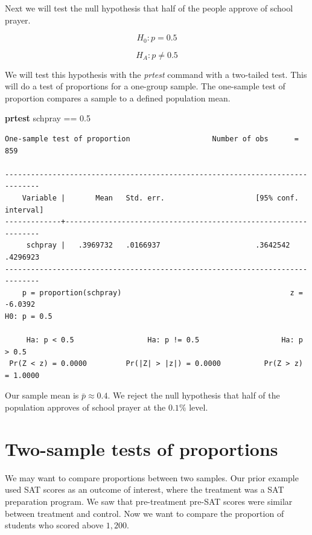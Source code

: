 \documentclass[
]{book}
\newenvironment{Shaded}{\begin{snugshade}}{\end{snugshade}}
\newcommand{\KeywordTok}[1]{\textcolor[rgb]{0.13,0.29,0.53}{\textbf{#1}}}
\newcommand{\NormalTok}[1]{#1}
\begin{document}
Next we will test the null hypothesis that half of the people approve of school prayer.

\[ H_{0}: p=0.5 \]

\[ H_{A}: p \neq 0.5 \]

We will test this hypothesis with the \emph{prtest} command with a two-tailed test. This will do a test of proportions for a one-group sample. The one-sample test of proportion compares a sample to a defined population mean.

\begin{Shaded}
\begin{Highlighting}[]
\KeywordTok{prtest}\NormalTok{ schpray == 0.5}
\end{Highlighting}
\end{Shaded}

\begin{verbatim}
One-sample test of proportion                   Number of obs      =       859

------------------------------------------------------------------------------
    Variable |       Mean   Std. err.                     [95% conf. interval]
-------------+----------------------------------------------------------------
     schpray |   .3969732   .0166937                      .3642542    .4296923
------------------------------------------------------------------------------
    p = proportion(schpray)                                       z =  -6.0392
H0: p = 0.5

     Ha: p < 0.5                 Ha: p != 0.5                   Ha: p > 0.5
 Pr(Z < z) = 0.0000         Pr(|Z| > |z|) = 0.0000          Pr(Z > z) = 1.0000
\end{verbatim}

Our sample mean is \(\bar{p} \approx 0.4\). We reject the null hypothesis that half of the population approves of school prayer at the \(0.1\%\) level.

\section{Two-sample tests of proportions}\label{two-sample-tests-of-proportions}

We may want to compare proportions between two samples. Our prior example used SAT scores as an outcome of interest, where the treatment was a SAT preparation program. We saw that pre-treatment pre-SAT scores were similar between treatment and control. Now we want to compare the proportion of students who scored above \(1,200\).
\end{document}

